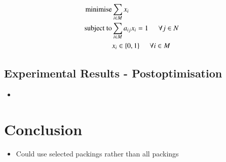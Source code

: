 \documentclass{elsarticle}
\begin{document}
\begin{align*}
\text{minimise} &\sum_{i \in M} x_i \\
\text{subject to} &\sum_{i \in M} a_{ij} x_i = 1 \hspace{5mm} \forall j \in N \\
&x_i \in \{0,1\} \hspace{5mm} \forall i \in M
\end{align*}

\subsection{Experimental Results - Postoptimisation}
\begin{itemize}
	\item
\end{itemize}

\section{Conclusion}
\begin{itemize}
	\item Could use selected packings rather than all packings
\end{itemize}





\end{document}
